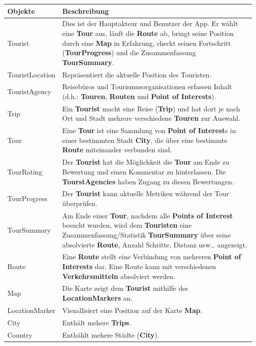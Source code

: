 \documentclass[a4paper,10pt,xetex]{article}
\begin{document}
\begin{longtabu} to \textwidth { | l | X[l] | }
\hline
\textbf{Objekte} & \textbf{Beschreibung} \\\hline
\endhead

Tourist & Dies ist der Hauptakteur und Benutzer der App. Er wählt eine \textbf{Tour} aus, läuft die \textbf{Route} ab, bringt seine Position durch eine \textbf{Map} in Erfahrung, checkt seinen Fortschritt (\textbf{TourProgress}) und die Zusammenfassung \textbf{TourSummary}. \\\hline
TouristLocation & Repräsentiert die aktuelle Position des Touristen. \\\hline
TouristAgency & Reisebüros und Tourismusorganisationen erfassen Inhalt (d.h.: \textbf{Touren}, \textbf{Routen} und \textbf{Point of Interests}).\\\hline
Trip & Ein \textbf{Tourist} macht eine Reise (\textbf{Trip}) und hat dort je nach Ort und Stadt mehrere verschiedene \textbf{Touren} zur Auswahl.\\\hline
Tour & Eine \textbf{Tour} ist eine Sammlung von \textbf{Point of Interest}s in einer bestimmten Stadt \textbf{City}, die über eine bestimmte \textbf{Route} miteinander verbunden sind.\\\hline
TourRating & Der \textbf{Tourist} hat die Möglichkeit die \textbf{Tour} am Ende zu Bewertung und einen Kommentar zu hinterlassen. Die \textbf{TourstAgencies} haben Zugang zu diesen Bewertungen.\\\hline
TourProgress & Der \textbf{Tourist} kann aktuelle Metriken während der Tour überprüfen. \\\hline
TourSummary & Am Ende einer \textbf{Tour}, nachdem alle \textbf{Points of Interest}  besucht wurden, wird dem \textbf{Touristen} eine Zusammenfassung/Statistik \textbf{TourSummary} über seine absolvierte \textbf{Route}, Anzahl Schritte, Distanz usw\ldots{} angezeigt.\\\hline
Route & Eine \textbf{Route} stellt eine Verbindung von mehreren \textbf{Point of Interests} dar. Eine Route kann mit verschiedenen \textbf{Verkehrsmitteln} absolviert werden.\\\hline
Map & Die Karte zeigt dem \textbf{Tourist} mithilfe des \textbf{LocationMarkers} an. \\\hline
LocationMarker & Visuallisiert eine Position auf der Karte \textbf{Map}. \\\hline
City & Enthält mehere \textbf{Trips}. \\\hline
Country & Enthählt mehere Städte (\textbf{City}).\\\hline

\end{longtabu}
\end{document}
